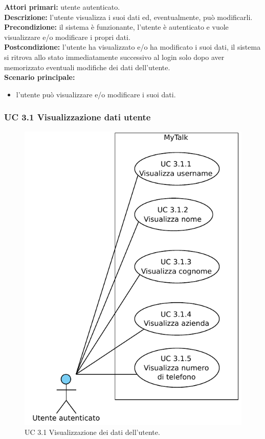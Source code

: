 \noindent
\textbf{Attori primari:} utente autenticato.\\
\textbf{Descrizione:} l'utente visualizza i suoi dati ed, eventualmente, può modificarli.\\
\textbf{Precondizione:} il sistema è funzionante, l'utente è autenticato e vuole visualizzare e/o modificare i propri dati.\\
\textbf{Postcondizione:} l'utente ha visualizzato e/o ha modificato i suoi dati, il sistema si ritrova allo stato immediatamente successivo al login solo dopo aver memorizzato eventuali modifiche dei dati dell'utente.\\
\textbf{Scenario principale:}
\begin{itemize}
\item l'utente può visualizzare e/o modificare i suoi dati.
\end{itemize}


\subsubsection{UC 3.1 Visualizzazione dati utente}

\begin{figure}[htbp]
\centering
\includegraphics[scale=0.7]{./casi_uso/UC3-1.pdf}
\caption{UC 3.1 Visualizzazione dei dati dell'utente.}
\end{figure}

